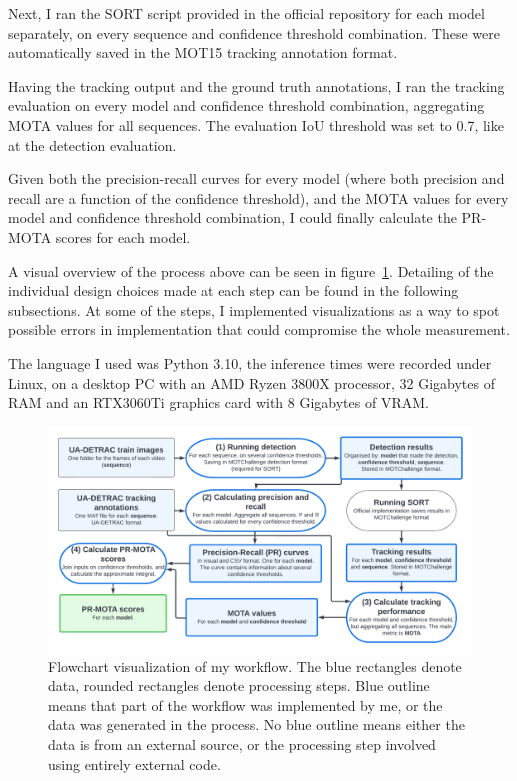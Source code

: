 Next, I ran the SORT script provided in the official repository for each model separately, on every sequence and confidence threshold combination. These were automatically saved in the MOT15 tracking annotation format.

Having the tracking output and the ground truth annotations, I ran the tracking evaluation on every model and confidence threshold combination, aggregating MOTA values for all sequences. The evaluation IoU threshold was set to 0.7, like at the detection evaluation.

Given both the precision-recall curves for every model (where both precision and recall are a function of the confidence threshold), and the MOTA values for every model and confidence threshold combination, I could finally calculate the PR-MOTA scores for each model.

A visual overview of the process above can be seen in figure~\ref{fig:workflow}. Detailing of the individual design choices made at each step can be found in the following subsections. At some of the steps, I implemented visualizations as a way to spot possible errors in implementation that could compromise the whole measurement. 

The language I used was Python 3.10, the inference times were recorded under Linux, on a desktop PC with an AMD Ryzen 3800X processor, 32 Gigabytes of RAM and an RTX3060Ti graphics card with 8 Gigabytes of VRAM. 

\begin{figure}[h]
    \captionsetup{width=\textwidth}
    \includegraphics[width=\textwidth]{figures/workflow.pdf}
    \caption{Flowchart visualization of my workflow. The blue rectangles denote data, rounded rectangles denote processing steps. Blue outline means that part of the workflow was implemented by me, or the data was generated in the process. No blue outline means either the data is from an external source, or the processing step involved using entirely external code.}
    \label{fig:workflow}
\end{figure}

